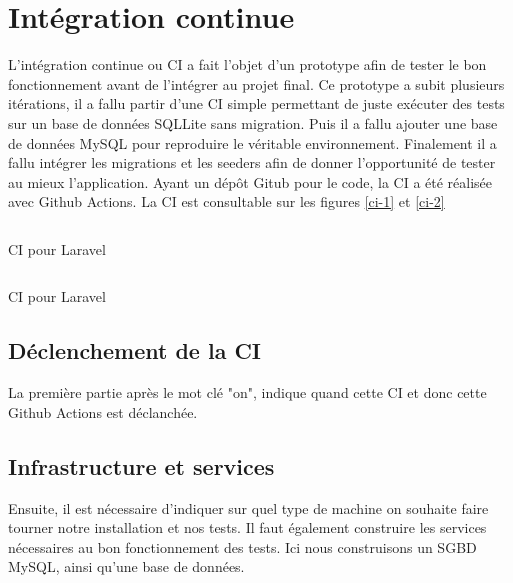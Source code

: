 \documentclass[
    iai, %
    il, %
]{heig-tb}
\begin{document}


\chapter{Intégration continue}
L'intégration continue ou CI a fait l'objet d'un prototype afin de tester le bon fonctionnement
avant de l'intégrer au projet final.\newline
Ce prototype a subit plusieurs itérations, il a fallu partir d'une CI simple permettant de juste
exécuter des tests sur un base de données SQLLite sans migration. Puis il a fallu ajouter une base
de données MySQL pour reproduire le véritable environnement. Finalement il a fallu intégrer les
migrations et les seeders afin de donner l'opportunité de tester au mieux l'application.\newline
Ayant un dépôt Gitub pour le code, la CI a été réalisée avec Github Actions.\newline
La CI est consultable sur les figures \ref{ci-1} et \ref{ci-2}

\begin{listing}[h]
    \inputminted{yaml}{assets/code/ci-1.yml}
    \caption{CI pour Laravel \label{ci-1}}
\end{listing}

\begin{listing}[h]
    \inputminted{yaml}{assets/code/ci-2.yml}
    \caption{CI pour Laravel \label{ci-2}}
\end{listing}

\section{Déclenchement de la CI}
La première partie après le mot clé "on", indique quand cette CI et donc cette Github Actions est
déclanchée.\newline

\section{Infrastructure et services}
Ensuite, il est nécessaire d'indiquer sur quel type de machine on souhaite faire tourner notre
installation et nos tests. Il faut également construire les services nécessaires au bon
fonctionnement des tests. Ici nous construisons un SGBD MySQL, ainsi qu'une base de données.\newline
\end{document}
